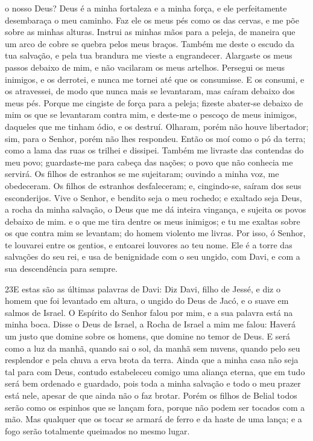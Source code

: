o nosso Deus? Deus é a minha fortaleza e a minha força, e ele
perfeitamente desembaraça o meu caminho. Faz ele os meus pés
como os das cervas, e me põe sobre as minhas alturas. Instrui
as minhas mãos para a peleja, de maneira que um arco de cobre se
quebra pelos meus braços. Também me deste o escudo da tua
salvação, e pela tua brandura me vieste a engrandecer.
Alargaste os meus passos debaixo de mim, e não vacilaram os
meus artelhos. Persegui os meus inimigos, e os derrotei, e
nunca me tornei até que os consumisse. E os consumi, e os
atravessei, de modo que nunca mais se levantaram, mas caíram debaixo
dos meus pés. Porque me cingiste de força para a peleja;
fizeste abater-se debaixo de mim os que se levantaram contra mim,
e deste-me o pescoço de meus inimigos, daqueles que me tinham
ódio, e os destruí. Olharam, porém não houve libertador; sim,
para o Senhor, porém não lhes respondeu. Então os moí como o
pó da terra; como a lama das ruas os trilhei e dissipei.
Também me livraste das contendas do meu povo; guardaste-me
para cabeça das nações; o povo que não conhecia me servirá.
Os filhos de estranhos se me sujeitaram; ouvindo a minha voz,
me obedeceram. Os filhos de estranhos desfaleceram; e,
cingindo-se, saíram dos seus esconderijos. Vive o Senhor, e
bendito seja o meu rochedo; e exaltado seja Deus, a rocha da minha
salvação, o Deus que me dá inteira vingança, e sujeita os
povos debaixo de mim. e o que me tira dentre os meus
inimigos; e tu me exaltas sobre os que contra mim se levantam; do
homem violento me livras. Por isso, ó Senhor, te louvarei
entre os gentios, e entoarei louvores ao teu nome. Ele é a
torre das salvações do seu rei, e usa de benignidade com o seu
ungido, com Davi, e com a sua descendência para sempre.

\medskip

\lettrine{23} E estas são as últimas palavras de Davi: Diz
Davi, filho de Jessé, e diz o homem que foi levantado em altura, o
ungido do Deus de Jacó, e o suave em salmos de Israel. O
Espírito do Senhor falou por mim, e a sua palavra está na minha
boca. Disse o Deus de Israel, a Rocha de Israel a mim me falou:
Haverá um justo que domine sobre os homens, que domine no temor de
Deus. E será como a luz da manhã, quando sai o sol, da manhã sem
nuvens, quando pelo seu resplendor e pela chuva a erva brota da
terra. Ainda que a minha casa não seja tal para com Deus,
contudo estabeleceu comigo uma aliança eterna, que em tudo será bem
ordenado e guardado, pois toda a minha salvação e todo o meu prazer
está nele, apesar de que ainda não o faz brotar. Porém os filhos
de Belial todos serão como os espinhos que se lançam fora, porque
não podem ser tocados com a mão. Mas qualquer que os tocar se
armará de ferro e da haste de uma lança; e a fogo serão totalmente
queimados no mesmo lugar.

